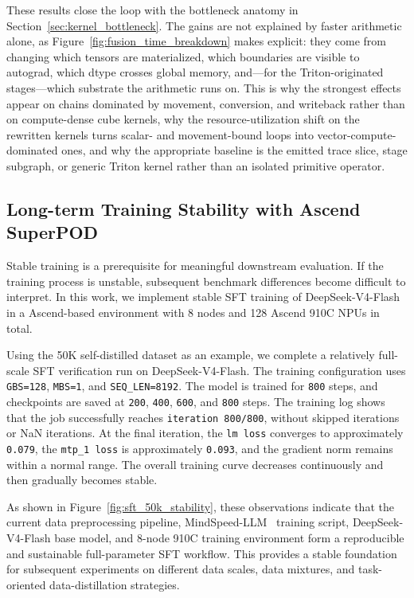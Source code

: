 These results close the loop with the bottleneck anatomy in Section~\ref{sec:kernel_bottleneck}. The gains are not explained by faster arithmetic alone, as Figure~\ref{fig:fusion_time_breakdown} makes explicit: they come from changing which tensors are materialized, which boundaries are visible to autograd, which dtype crosses global memory, and---for the Triton-originated stages---which substrate the arithmetic runs on. This is why the strongest effects appear on chains dominated by movement, conversion, and writeback rather than on compute-dense cube kernels, why the resource-utilization shift on the rewritten kernels turns scalar- and movement-bound loops into vector-compute-dominated ones, and why the appropriate baseline is the emitted trace slice, stage subgraph, or generic Triton kernel rather than an isolated primitive operator.


\subsection{Long-term Training Stability with Ascend SuperPOD}
\label{subsec:npu_training_stability}

Stable training is a prerequisite for meaningful downstream evaluation. If the training process is unstable, subsequent benchmark differences become difficult to interpret. In this work, we implement stable SFT training of DeepSeek-V4-Flash in a Ascend-based environment with 8 nodes and 128 Ascend 910C NPUs in total.

Using the 50K self-distilled dataset as an example, we complete a relatively full-scale SFT verification run on DeepSeek-V4-Flash. The training configuration uses \texttt{GBS=128}, \texttt{MBS=1}, and \texttt{SEQ\_LEN=8192}. The model is trained for \texttt{800} steps, and checkpoints are saved at \texttt{200}, \texttt{400}, \texttt{600}, and \texttt{800} steps. The training log shows that the job successfully reaches \texttt{iteration 800/800}, without skipped iterations or NaN iterations. At the final iteration, the \texttt{lm loss} converges to approximately \texttt{0.079}, the \texttt{mtp\_1 loss} is approximately \texttt{0.093}, and the gradient norm remains within a normal range. The overall training curve decreases continuously and then gradually becomes stable.

As shown in Figure~\ref{fig:sft_50k_stability}, these observations indicate that the current data preprocessing pipeline, MindSpeed-LLM~\citep{mindspeed-llm} training script, DeepSeek-V4-Flash base model, and 8-node 910C training environment form a reproducible and sustainable full-parameter SFT workflow. This provides a stable foundation for subsequent experiments on different data scales, data mixtures, and task-oriented data-distillation strategies.

